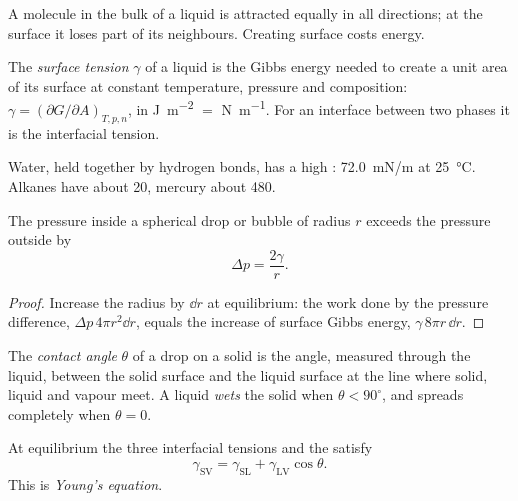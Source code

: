 A molecule in the bulk of a liquid is attracted equally in all directions; at
the surface it loses part of its neighbours. Creating surface costs energy.

\begin{definition}\label{def:b3:colloids:surface-tension}
The \emph{surface tension} $\gamma$ of a liquid is the Gibbs
energy needed to create a unit area of its surface at constant temperature,
pressure and composition: $\gamma = (\partial G/\partial A)_{T,p,n}$, in \unit{J.m^{-2}} $=$ \unit{N.m^{-1}}. For an
interface between two phases it is the interfacial tension.
\end{definition}

Water, held together by hydrogen bonds, has a high : \qty{72.0}{mN/m}
at \qty{25}{\celsius}. Alkanes have about 20, mercury about 480.

\begin{proposition}\label{prop:b3:colloids:laplace}
The pressure inside a spherical drop or bubble of radius $r$ exceeds the
pressure outside by
\[
  \Delta p = \frac{2\gamma}{r} .
\]
\end{proposition}

\begin{proof}
Increase the radius by $\dd r$ at equilibrium: the work done by the pressure
difference, $\Delta p\,4\pi r^2\dd r$, equals the increase of surface Gibbs energy, $\gamma\,8\pi r\,\dd r$.
\end{proof}

\begin{definition}\label{def:b3:colloids:wetting}
The \emph{contact angle} $\theta$ of a drop on a solid is the angle,
measured through the liquid, between the solid surface and the liquid surface
at the line where solid, liquid and vapour meet. A liquid \emph{wets}
the solid when $\theta < 90^\circ$, and spreads completely when $\theta = 0$.
\end{definition}

\begin{theorem}\label{thm:b3:colloids:young}
At equilibrium the three interfacial tensions and the  satisfy
\[
  \gamma_{\mathrm{SV}} = \gamma_{\mathrm{SL}} + \gamma_{\mathrm{LV}}\cos\theta .
\]
This is \emph{Young's equation}.
\end{theorem}

